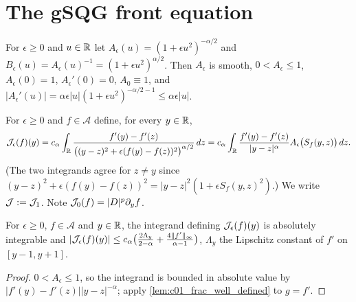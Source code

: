 \section{The gSQG front equation}

\begin{definition}
  \label{def:A_eps}
  For $\epsilon\ge0$ and $u\in\mathbb{R}$ let $A_\epsilon(u)=(1+\epsilon u^2)^{-\alpha/2}$ and
  $B_\epsilon(u)=A_\epsilon(u)^{-1}=(1+\epsilon u^2)^{\alpha/2}$.  Then $A_\epsilon$ is smooth,
  $0<A_\epsilon\le1$, $A_\epsilon(0)=1$, $A_\epsilon'(0)=0$, $A_0\equiv1$, and
  $|A_\epsilon'(u)|=\alpha\epsilon|u|(1+\epsilon u^2)^{-\alpha/2-1}\le\alpha\epsilon|u|$.
\end{definition}

\begin{definition}
  \label{def:c01_Jfull_eps}
  For $\epsilon\ge0$ and $f\in\mathcal A$ define, for every $y\in\mathbb{R}$,
  \[
    \mathcal{J}_\epsilon(f)(y)=c_\alpha\int_{\mathbb{R}}
    \frac{f'(y)-f'(z)}{\bigl((y-z)^2+\epsilon(f(y)-f(z))^2\bigr)^{\alpha/2}}\,dz
    =c_\alpha\int_{\mathbb{R}}\frac{f'(y)-f'(z)}{|y-z|^\alpha}A_\epsilon\bigl(S_f(y,z)\bigr)\,dz .
  \]
  (The two integrands agree for $z\ne y$ since
  $(y-z)^2+\epsilon(f(y)-f(z))^2=|y-z|^2(1+\epsilon S_f(y,z)^2)$.)  We write
  $\mathcal{J}:=\mathcal{J}_1$.  Note $\mathcal{J}_0(f)=|D|^p\partial_yf$.
\end{definition}

\begin{lemma}
  \label{lem:c01_J_well_defined}
  For $\epsilon\ge0$, $f\in\mathcal A$ and $y\in\mathbb{R}$, the integrand defining $\mathcal{J}_\epsilon(f)(y)$
  is absolutely integrable and
  $|\mathcal{J}_\epsilon(f)(y)|\le c_\alpha\bigl(\frac{2\Lambda_y}{2-\alpha}+\frac{4\|f'\|_\infty}{\alpha-1}\bigr)$,
  $\Lambda_y$ the Lipschitz constant of $f'$ on $[y-1,y+1]$.
\end{lemma}
\begin{proof}
  $0<A_\epsilon\le1$, so the integrand is bounded in absolute value by
  $|f'(y)-f'(z)||y-z|^{-\alpha}$; apply \cref{lem:c01_frac_well_defined} to $g=f'$.
\end{proof}


